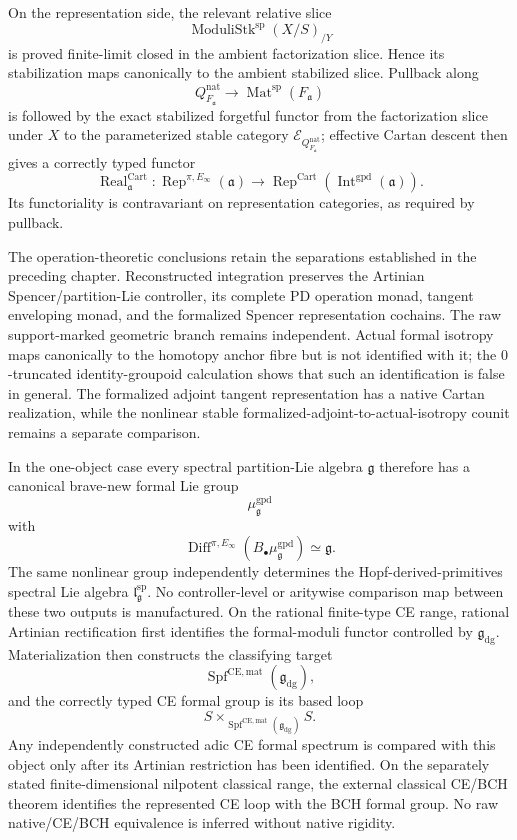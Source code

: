 On the representation side, the relevant relative slice
\[
    \operatorname{ModuliStk}^{\mathrm{sp}}(X/S)_{/Y}
\]
is proved finite-limit closed in the ambient factorization slice.  Hence its
stabilization maps canonically to the ambient stabilized slice.  Pullback along
\[
    Q^{\mathrm{nat}}_{F_{\mathfrak a}}
    \longrightarrow
    \operatorname{Mat}^{\mathrm{sp}}(F_{\mathfrak a})
\]
is followed by the exact stabilized forgetful functor from the factorization
slice under $X$ to the parameterized stable category
$\mathcal E_{Q^{\mathrm{nat}}_{F_{\mathfrak a}}}$; effective Cartan descent
then gives a correctly typed functor
\[
    \operatorname{Real}^{\mathrm{Cart}}_{\mathfrak a}:
    \operatorname{Rep}^{\pi,E_\infty}(\mathfrak a)
    \longrightarrow
    \operatorname{Rep}^{\mathrm{Cart}}
    (\operatorname{Int}^{\mathrm{gpd}}(\mathfrak a)).
\]
Its functoriality is contravariant on representation categories, as required
by pullback.

The operation-theoretic conclusions retain the separations established in the
preceding chapter.  Reconstructed integration preserves the Artinian
Spencer/partition-Lie controller, its complete PD operation monad, tangent
enveloping monad, and the formalized Spencer representation cochains.  The
raw support-marked geometric branch remains independent.  Actual formal
isotropy maps canonically to the homotopy anchor fibre but is not identified
with it; the $0$-truncated identity-groupoid calculation shows that such an
identification is false in general.  The formalized adjoint tangent
representation has a native Cartan realization, while the nonlinear stable
formalized-adjoint-to-actual-isotropy counit remains a separate comparison.

In the one-object case every spectral partition-Lie algebra $\mathfrak g$
therefore has a canonical brave-new formal Lie group
\[
    \mu^{\mathrm{gpd}}_{\mathfrak g}
\]
with
\[
    \operatorname{Diff}^{\pi,E_\infty}
    (B_\bullet\mu^{\mathrm{gpd}}_{\mathfrak g})
    \simeq
    \mathfrak g.
\]
The same nonlinear group independently determines the Hopf-derived-primitives
spectral Lie algebra
$\mathfrak l^{\mathrm{sp}}_{\mathfrak g}$.  No controller-level or aritywise
comparison map between these two outputs is manufactured.  On the rational finite-type CE range, rational Artinian rectification first
identifies the formal-moduli functor controlled by
$\mathfrak g_{\mathrm{dg}}$.  Materialization then constructs the classifying
target
\[
    \operatorname{Spf}^{\mathrm{CE,mat}}(\mathfrak g_{\mathrm{dg}}),
\]
and the correctly typed CE formal group is its based loop
\[
    S\times_{\operatorname{Spf}^{\mathrm{CE,mat}}(\mathfrak g_{\mathrm{dg}})}S.
\]
Any independently constructed adic CE formal spectrum is compared with this
object only after its Artinian restriction has been identified.  On the
separately stated finite-dimensional nilpotent classical range, the external
classical CE/BCH theorem identifies the represented CE loop with the BCH
formal group.  No raw native/CE/BCH equivalence is inferred without native
rigidity.

